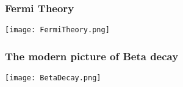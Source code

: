 \begin{frame}
\frametitle{Fermi Theory}

\texttt{[image: FermiTheory.png]}

\end{frame}

\begin{frame}
\frametitle{The modern picture of Beta decay}

\texttt{[image: BetaDecay.png]}

\end{frame}